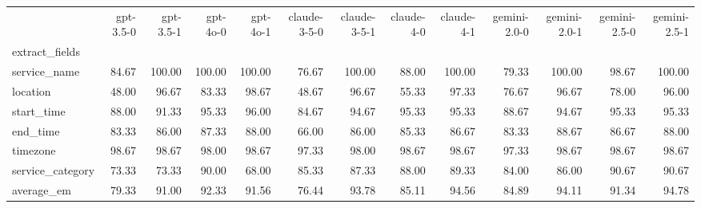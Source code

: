 \begin{tabular}{lrrrrrrrrrrrr}
\toprule
 & gpt-3.5-0 & gpt-3.5-1 & gpt-4o-0 & gpt-4o-1 & claude-3-5-0 & claude-3-5-1 & claude-4-0 & claude-4-1 & gemini-2.0-0 & gemini-2.0-1 & gemini-2.5-0 & gemini-2.5-1 \\
extract_fields &  &  &  &  &  &  &  &  &  &  &  &  \\
\midrule
service_name & 84.67 & 100.00 & 100.00 & 100.00 & 76.67 & 100.00 & 88.00 & 100.00 & 79.33 & 100.00 & 98.67 & 100.00 \\
location & 48.00 & 96.67 & 83.33 & 98.67 & 48.67 & 96.67 & 55.33 & 97.33 & 76.67 & 96.67 & 78.00 & 96.00 \\
start_time & 88.00 & 91.33 & 95.33 & 96.00 & 84.67 & 94.67 & 95.33 & 95.33 & 88.67 & 94.67 & 95.33 & 95.33 \\
end_time & 83.33 & 86.00 & 87.33 & 88.00 & 66.00 & 86.00 & 85.33 & 86.67 & 83.33 & 88.67 & 86.67 & 88.00 \\
timezone & 98.67 & 98.67 & 98.00 & 98.67 & 97.33 & 98.00 & 98.67 & 98.67 & 97.33 & 98.67 & 98.67 & 98.67 \\
service_category & 73.33 & 73.33 & 90.00 & 68.00 & 85.33 & 87.33 & 88.00 & 89.33 & 84.00 & 86.00 & 90.67 & 90.67 \\
average_em & 79.33 & 91.00 & 92.33 & 91.56 & 76.44 & 93.78 & 85.11 & 94.56 & 84.89 & 94.11 & 91.34 & 94.78 \\
\bottomrule
\end{tabular}
